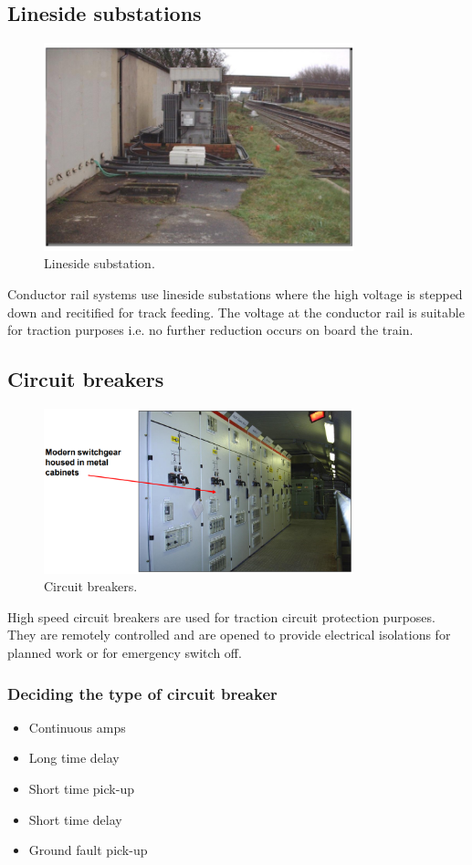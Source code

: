 \subsection{Lineside substations}
\begin{figure}[H]
    \centering
    \includegraphics[width = 0.8\textwidth]{img/figure119.png}
    \caption{Lineside substation.}
\end{figure}
Conductor rail systems use lineside substations where the high voltage is stepped down and recitified for track feeding. The voltage at the conductor rail is suitable for traction purposes i.e. no further reduction occurs on board the train.
\subsection{Circuit breakers}
\begin{figure}[H]
    \centering
    \includegraphics[width = 0.8\textwidth]{img/figure120.png}
    \caption{Circuit breakers.}
\end{figure}
High speed circuit breakers are used for traction circuit protection purposes. They are remotely controlled and are opened to provide electrical isolations for planned work or for emergency switch off.
\subsubsection{Deciding the type of circuit breaker}
\begin{itemize}
    \item Continuous amps
    \item Long time delay
    \item Short time pick-up
    \item Short time delay
    \item Ground fault pick-up
\end{itemize}

